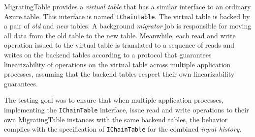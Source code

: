 MigratingTable provides a \emph{virtual table} that has a similar interface to an ordinary Azure table. This interface is named \texttt{IChainTable}. The virtual table is backed by a pair of \emph{old} and \emph{new} tables. A background \emph{migrator} job is responsible for moving all data from the old table to the new table. Meanwhile, each read and write operation issued to the virtual table is translated to a sequence of reads and writes on the backend tables according to a protocol that guarantees linearizability of operations on the virtual table across multiple application processes, assuming that the backend tables respect their own linearizability guarantees.

The testing goal was to ensure that when multiple application processes, implementing the \texttt{IChainTable} interface, issue read and write operations to their own MigratingTable instances with the same backend tables, the behavior complies with the specification of \texttt{IChainTable} for the combined \emph{input history}.



